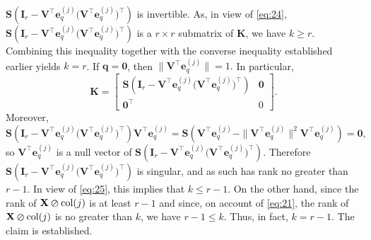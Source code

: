 \documentclass[11pt,a4paper]{article}
\theoremstyle{break}
\numberwithin{dummy}{section}
\theoremstyle{plain}
\theoremstyle{plain}
\theoremstyle{plain}
\theoremstyle{plain}
\theoremstyle{plain}
\theoremstyle{MyNonumberplain}
\newcommand{\0}{\M{0}}
\newcommand{\M}[1]{\mathbf{#1}}
\newcommand{\T}{\top}
\newcommand{\ve}[1]{\mathbf{#1}}
\newcommand{\eve}[2]{\mathbf{e}^{(#1)}_{#2}}
\newcommand{\zercol}[2]{\M{#1} \varoslash \mathrm{col}(#2)}
\begin{document}
\begin{math}
  \M{S}
    \left(
      \M{I}_r -  \M{V}^\T \eve{j}{q} \big(\M{V}^\T \eve{j}{q} \big)^\T
    \right)
\end{math}
is invertible. As, in view of \eqref{eq:24}, 
\begin{math}
  \M{S}
    \left(
      \M{I}_r -  \M{V}^\T \eve{j}{q} \big(\M{V}^\T \eve{j}{q} \big)^\T
    \right)
\end{math}
is a $r \times r$ submatrix of $\M{K}$, we have $k \geq r$. Combining this inequality together with the converse inequality established earlier yields $k = r$. If $\ve{q} = \0$, then
\begin{math}
  \| \M{V}^\T \eve{j}{q} \| = 1.
\end{math}
In particular,
\begin{equation}
  \label{eq:25}
   \M{K}
  =
  \begin{bmatrix}
    \M{S}
    \left(
      \M{I}_r -  \M{V}^\T \eve{j}{q} \big(\M{V}^\T \eve{j}{q} \big)^\T
    \right)
    &
    \0
    \\
    \0^\T & 0 
  \end{bmatrix}.
\end{equation}
Moreover,
\begin{displaymath}
  \M{S}
  \left(
    \M{I}_r -  \M{V}^\T \eve{j}{q} \big(\M{V}^\T \eve{j}{q} \big)^\T
  \right)
  \M{V}^\T \eve{j}{q}
  =
  \M{S}
  \left(
  \M{V}^\T \eve{j}{q}
  - \| \M{V}^\T \eve{j}{q} \|^2 \M{V}^\T \eve{j}{q}
  \right)
  = \0, 
\end{displaymath}
so $\M{V}^\T \eve{j}{q}$ is a null vector of
\begin{math}
   \M{S}
    \left(
      \M{I}_r -  \M{V}^\T \eve{j}{q} \big(\M{V}^\T \eve{j}{q} \big)^\T
    \right).
  \end{math}
Therefore
\begin{math}
  \M{S}
  \left(
    \M{I}_r -  \M{V}^\T \eve{j}{q} \big(\M{V}^\T \eve{j}{q} \big)^\T
  \right)
\end{math}
is singular, and as such has rank no greater than $r - 1$. In view of \eqref{eq:25}, this implies that $k \leq r-1$. On the other hand, since the rank of $\zercol{X}{j}$ is at least $r - 1$ and since, on account of \eqref{eq:21}, the rank of $\zercol{X}{j}$ is no greater than $k$, we have $r -1 \leq k$. Thus, in fact, $k = r - 1$. The claim is established.
\end{document}
